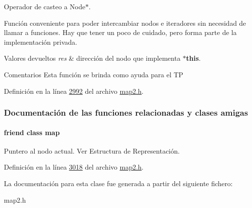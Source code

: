 \-Operador de casteo a \-Node$\ast$. 

\-Función conveniente para poder intercambiar nodos e iteradores sin necesidad de llamar a funciones. \-Hay que tener un poco de cuidado, pero forma parte de la implementación privada.


\begin{DoxyRetVals}{\-Valores devueltos}
{\em res} & dirección del nodo que implementa {\bfseries $\ast$this}.\\
\hline
\end{DoxyRetVals}
\begin{DoxyRemark}{\-Comentarios}
\-Esta función se brinda como ayuda para el \-T\-P 
\end{DoxyRemark}


\-Definición en la línea \hyperlink{map2_8h_source_l02992}{2992} del archivo \hyperlink{map2_8h_source}{map2.\-h}.



\subsubsection{\-Documentación de las funciones relacionadas y clases amigas}
\hypertarget{classaed2_1_1iterator_1_1iterator_aeda338414e516b47761f994fb78056c6_aeda338414e516b47761f994fb78056c6}{
\paragraph[{map}]{\setlength{\rightskip}{0pt plus 5cm}friend class {\bf map}}}\label{classaed2_1_1iterator_1_1iterator_aeda338414e516b47761f994fb78056c6_aeda338414e516b47761f994fb78056c6}


\-Puntero al nodo actual. \-Ver \-Estructura de \-Representación. 



\-Definición en la línea \hyperlink{map2_8h_source_l03018}{3018} del archivo \hyperlink{map2_8h_source}{map2.\-h}.



\-La documentación para esta clase fue generada a partir del siguiente fichero\-:\begin{DoxyCompactItemize}
\item 
map2.\-h\end{DoxyCompactItemize}
